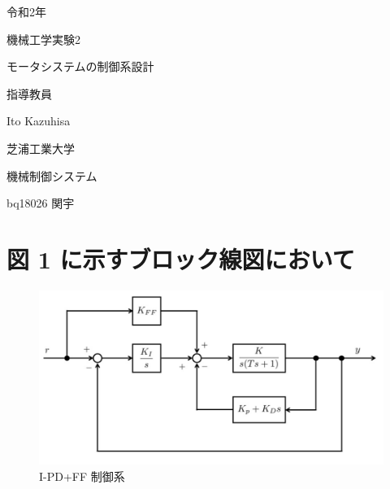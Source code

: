 \documentclass[xelatex,ja=standard,jafont=noto]{bxjsarticle}
\date{11.4 2020}
\numberwithin{figure}{section}
\begin{document}
\renewcommand{\figurename}{Fig.}
\renewcommand{\tablename}{Table }



	\begin{titlepage}
			\begin{center}
				
				{\Large 令和2年}
				
				\vspace{10truept}
				
				{\Large 機械工学実験2}
				
				\vspace*{140truept}
				
				{\Huge モータシステムの制御系設計} 
				
				\vspace{160truept}
				
				{\Large 指導教員}
				
				\vspace{10truept}
				
				{\Large  Ito Kazuhisa }
				
				\vspace{70truept}
				{\Large 芝浦工業大学}
				
				\vspace{10truept}
				
				{\Large 機械制御システム}
				
				\vspace{30truept}
				
				{\Large bq18026 関宇}      
				
			\end{center}
		\end{titlepage}
%


\tableofcontents

\newpage



\section{図 1 に示すブロック線図において}

\begin{figure}[h!]
    \centering
    \includegraphics[scale=0.6]{01.jpg}
    \caption{I-PD+FF 制御系 }
\end{figure}
\end{document}
